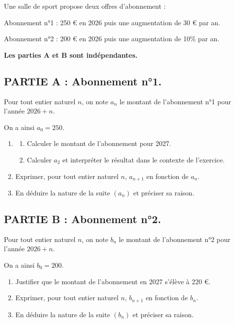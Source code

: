 Une salle de sport propose deux offres d'abonnement :

Abonnement n°1 : 250 \euro{} en 2026 puis une augmentation de 30 \euro{} par an.

Abonnement n°2 : 200 \euro{} en 2026 puis une augmentation de 10\% par an.

\textbf{Les parties A et B sont indépendantes.}


\subsection*{PARTIE A : Abonnement n°1.}

Pour tout entier naturel $n$, on note $a_n$ le montant de l'abonnement n°1 pour l'année $2026+n$.

On a ainsi $a_0=250$.
\begin{enumerate}
\item
\begin{enumerate}[label=\alph*)]
\item Calculer le montant de l'abonnement pour 2027.
\item Calculer $a_2$ et interpréter le résultat dans le contexte de l'exercice.
\end{enumerate}
\item Exprimer, pour tout entier naturel $n$, $a_{n+1}$ en fonction de $a_n$.
\item En déduire la nature de la suite $(a_n)$ et 
préciser sa raison.
\end{enumerate}

\bigskip

\subsection*{PARTIE B : Abonnement n°2.}

Pour tout entier naturel $n$, on note $b_n$ le montant de l'abonnement n°2 pour l'année $2026+n$.

On a ainsi $b_0=200$.
\begin{enumerate}
\item Justifier que le montant de l'abonnement en 2027 s'élève à 220 \euro{}.
\item Exprimer, pour tout entier naturel $n$, $b_{n+1}$ en fonction de $b_n$.
\item En déduire la nature de la suite $(b_n)$ et préciser sa raison.
\end{enumerate}

\bigskip

